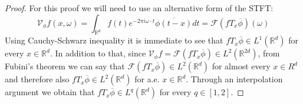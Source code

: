 \documentclass[corpo=11pt, stile=classica, tipotesi=custom,
greek, evenboxes, english]{toptesi}
\numberwithin{equation}{chapter}
\newcommand{\R}{\mathbb{R}} %
\newcommand{\V}{\mathcal{V}} %
\newcommand{\F}{\mathscr{F}} %
\begin{document}
\begin{proof}
	For this proof we will need to use an alternative form of the STFT:
	\begin{equation*}
		\V_{\phi} f(x,\omega) = \int_{\R^d} f(t) e^{-2\pi i \omega \cdot t} \overline{\phi(t-x)}dt = \F(f T_x \overline{\phi})(\omega)
	\end{equation*}
	Using Cauchy-Schwarz inequality it is immediate to see that $f T_x \overline{\phi} \in L^1(\R^d)$ for every $x \in \R^d$. In addition to that, since $\V_{\phi} f = \F(f T_x \overline{\phi}) \in L^2(\R^{2d})$, from Fubini's theorem we can say that $ \F(f T_x \overline{\phi}) \in L^2(\R^d) $ for almost every $x \in R^d$ and therefore also $f T_x \overline{\phi} \in L^2(\R^d)$ for a.e. $x \in \R^d$. Through an interpolation argument we obtain that $f T_x \overline{\phi} \in L^q(\R^d)$ for every $q \in [1,2]$.
	

\end{proof}
\end{document}
